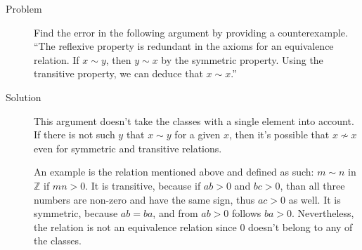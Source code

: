 \begin{description}
\item[Problem] Find the error in the following argument by providing a
counterexample. ``The reflexive property is redundant in the axioms for an
equivalence relation. If $x \sim y$, then $y \sim x$ by the symmetric
property. Using the transitive property, we can deduce that $x \sim x$.''
\item[Solution] This argument doesn't take the classes with a single element
into account. If there is not such $y$ that $x \sim y$ for a given $x$, then
it's possible that $x \not\sim x$ even for symmetric and transitive relations.

An example is the relation mentioned above and defined as such: $m \sim n$ in
$\mathbb{Z}$ if $mn > 0$. It is transitive, because if $ab > 0$ and $bc > 0$,
than all three numbers are non-zero and have the same sign, thus $ac > 0$ as
well. It is symmetric, because $ab = ba$, and from $ab > 0$ follows $ba > 0$.
Nevertheless, the relation is not an equivalence relation since $0$ doesn't
belong to any of the classes.
\end{description}

